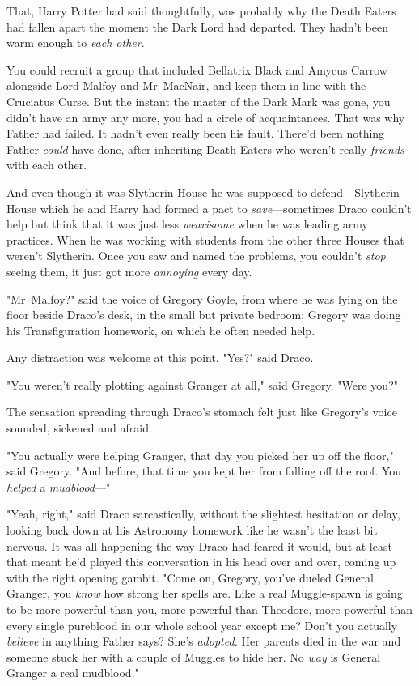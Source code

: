 That, Harry Potter had said thoughtfully, was probably why the Death Eaters had
fallen apart the moment the Dark Lord had departed. They hadn't been warm
enough to \emph{each other}.

You could recruit a group that included Bellatrix Black and Amycus Carrow
alongside Lord Malfoy and Mr~MacNair, and keep them in line with the Cruciatus
Curse. But the instant the master of the Dark Mark was gone, you didn't have an
army any more, you had a circle of acquaintances. That was why Father had
failed. It hadn't even really been his fault. There'd been nothing Father
\emph{could} have done, after inheriting Death Eaters who weren't really
\emph{friends} with each other.

And even though it was Slytherin House he was supposed to defend---Slytherin
House which he and Harry had formed a pact to \emph{save}---sometimes Draco
couldn't help but think that it was just less \emph{wearisome} when he was
leading army practices. When he was working with students from the other three
Houses that weren't Slytherin. Once you saw and named the problems, you
couldn't \emph{stop} seeing them, it just got more \emph{annoying} every day.

"Mr~Malfoy?" said the voice of Gregory Goyle, from where he was lying on the
floor beside Draco's desk, in the small but private bedroom; Gregory was doing
his Transfiguration homework, on which he often needed help.

Any distraction was welcome at this point. "Yes?" said Draco.

"You weren't really plotting against Granger at all," said Gregory. "Were you?"

The sensation spreading through Draco's stomach felt just like Gregory's voice
sounded, sickened and afraid.

"You actually were helping Granger, that day you picked her up off the floor,"
said Gregory. "And before, that time you kept her from falling off the roof.
You \emph{helped} a \emph{mudblood}---"

"Yeah, right," said Draco sarcastically, without the slightest hesitation or
delay, looking back down at his Astronomy homework like he wasn't the least bit
nervous. It was all happening the way Draco had feared it would, but at least
that meant he'd played this conversation in his head over and over, coming up
with the right opening gambit. "Come on, Gregory, you've dueled General
Granger, you \emph{know} how strong her spells are. Like a real Muggle-spawn is
going to be more powerful than you, more powerful than Theodore, more powerful
than every single pureblood in our whole school year except me? Don't you
actually \emph{believe} in anything Father says? She's \emph{adopted.} Her
parents died in the war and someone stuck her with a couple of Muggles to hide
her. No \emph{way} is General Granger a real mudblood."

